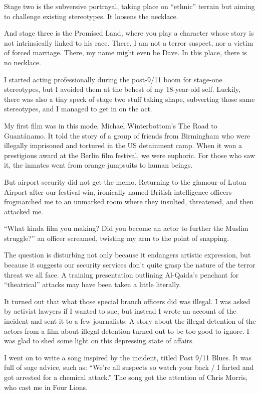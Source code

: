 \documentclass[10pt,a4paper]{article}
\begin{document}
Stage two is the subversive portrayal, taking place on “ethnic” terrain but aiming to challenge existing stereotypes. It loosens the necklace.

And stage three is the Promised Land, where you play a character whose story is not intrinsically linked to his race. There, I am not a terror suspect, nor a victim of forced marriage. There, my name might even be Dave. In this place, there is no necklace.

I started acting professionally during the post-9/11 boom for stage-one stereotypes, but I avoided them at the behest of my 18-year-old self. Luckily, there was also a tiny speck of stage two stuff taking shape, subverting those same stereotypes, and I managed to get in on the act.

My first film was in this mode, Michael Winterbottom’s The Road to Guantánamo. It told the story of a group of friends from Birmingham who were illegally imprisoned and tortured in the US detainment camp. When it won a prestigious award at the Berlin film festival, we were euphoric. For those who saw it, the inmates went from orange jumpsuits to human beings.

But airport security did not get the memo. Returning to the glamour of Luton Airport after our festival win, ironically named British intelligence officers frogmarched me to an unmarked room where they insulted, threatened, and then attacked me.

“What kinda film you making? Did you become an actor to further the Muslim struggle?” an officer screamed, twisting my arm to the point of snapping.

The question is disturbing not only because it endangers artistic expression, but because it suggests our security services don’t quite grasp the nature of the terror threat we all face. A training presentation outlining Al-Qaida’s penchant for “theatrical” attacks may have been taken a little literally.

It turned out that what those special branch officers did was illegal. I was asked by activist lawyers if I wanted to sue, but instead I wrote an account of the incident and sent it to a few journalists. A story about the illegal detention of the actors from a film about illegal detention turned out to be too good to ignore. I was glad to shed some light on this depressing state of affairs.

I went on to write a song inspired by the incident, titled Post 9/11 Blues. It was full of sage advice, such as: “We’re all suspects so watch your back / I farted and got arrested for a chemical attack.” The song got the attention of Chris Morris, who cast me in Four Lions.
\end{document}
